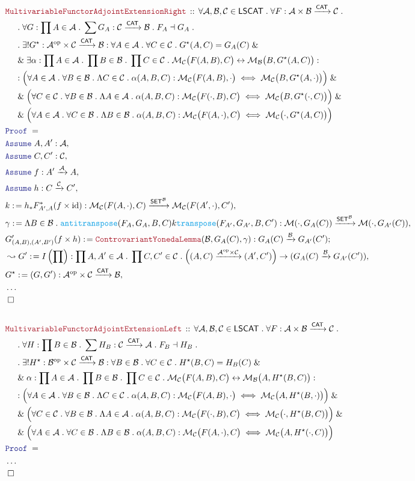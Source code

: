 \documentclass[12pt]{scrartcl}
\newcommand{\FUNC}[1]{\textcolor{Cerulean}{\mathtt{#1}}}
\newcommand{\LOGIC}[1]{\textcolor{Blue}{\mathtt{#1}}}
\newcommand{\THM}[1]{\textcolor{Maroon}{\mathtt{#1}}}
\renewcommand{\.}{\; . \;}
\newcommand{\de}{: \kern 0.1pc =}
\newcommand{\Theorem}[2]{& \THM{#1} \, :: \, #2 \\ & \Proof = \\ }
\newcommand{\NewLine}{\\ & \kern 1pc}
\newcommand{\Page}[1]{ \begin{align*} #1 \end{align*}   }
\newcommand{\NoProof}{ & \ldots \\ \EndProof}
\renewcommand{\And}{\; \& \;}
\DeclareMathOperator*{\id}{id}
\newcommand{\Mor}{\mathcal{M}}
\newcommand{\ToBij}{\leftrightarrow}
\newcommand{\Arrow}{\xrightarrow}
\newcommand{\Say}[3]{& #1 \de #2 : #3, \\}
\newcommand{\Conclude}[3]{& #1 \de #2 : #3; \\}
\newcommand{\Derive}[3]{& \leadsto #1 \de #2 : #3, \\}
\newcommand{\Assume}[2]{& \LOGIC{Assume} \; #1 : #2, \\}
\newcommand{\QED}{\; \square}
\newcommand{\EndProof}{& \QED \\}
\newcommand{\Proof}{\LOGIC{Proof} \; }
\newcommand{\op}{\mathrm{op}}
\newcommand{\C}{\mathcal{C}}
\newcommand{\A}{\mathcal{A}}
\newcommand{\B}{\mathcal{B}}
\newcommand{\CAT}{\mathsf{CAT}}
\newcommand{\SET}{\mathsf{SET}}
\begin{document}
\newpage
\Page{
	\Theorem{MultivariableFunctorAdjointExtensionRight}{
		\forall \A, \B, \C \in \mathsf{LSCAT} \.
		\forall F : \A \times \B \Arrow{\CAT} \C \. \NewLine \.
		\forall G  : \prod A \in \A \. 
			\sum G_A :  \C \Arrow{\CAT} \B \.  
			F_A \dashv G_A \. \NewLine \.
		\exists!  G^\star : \A^\op \times \C \Arrow{\CAT} \B :
		\forall A \in \A \. \forall C \in \C \. G^\star(A,C) = G_A(C) \And \NewLine \And
		\exists \alpha : \prod A \in \A \. 
			\prod B \in \B \. 
			\prod C \in \C \.  
			\Mor_\C\big(F(A,B),C\big) \ToBij \Mor_\B\big(B,G^\star(A,C)\big) : \NewLine :
			\Big(	\forall A \in \A \. 
				\forall B \in \B \.
				\Lambda C \in \C  \. 
				\alpha(A,B,C) :  \Mor_{\C}\big( F(A,B),\cdot\big) \iff  \Mor_{\C}\big(B,G^\star(A,\cdot)\big)
			\Big) \And \NewLine \And
			\Big(	\forall C \in \C \.
				\forall B \in \B \.
				\Lambda A \in \A  \. 
				\alpha(A,B,C) :  \Mor_{\C}\big( F(\cdot,B),C\big) \iff  \Mor_{\C}\big(B,G^\star(\cdot,C)\big)
			\Big) \And \NewLine \And
			\Big(	\forall A \in \A \.
				\forall C \in \B \.
				\Lambda B \in \B  \. 
				\alpha(A,B,C) :  \Mor_{\C}\big( F(A,\cdot),C\big) \iff  \Mor_{\C}\big(\cdot,G^\star(A,C)\big)
			\Big) 
		}
		\Assume{A,A'}{\A}
		\Assume{C,C'}{\C}
		\Assume{f}{A' \Arrow{\A} A}
		\Assume{h}{C \Arrow{\C} C'}
		\Say{k}{h_*F_{A',A}^*(f \times \id)}{  \Mor_\C(F(A,\cdot),C) \Arrow{\SET^\B} \Mor_\C(F(A',\cdot),C') }
		\Say{\gamma}{ \Lambda B \in \B \.  \FUNC{antitranspose}(F_A,G_A,B,C) k \FUNC{transpose}(F_{A'},G_{A'},B,C')}
		{   \Mor(\cdot,G_A(C)) \Arrow{\SET^\B}  \Mor(\cdot,G_{A'}(C)) }
		\Conclude{G'_{(A,B),(A',B')}(f \times h)}{\THM{ControvariantYonedaLemma}(\B,G_A(C),\gamma)}
		{  G_A(C) \Arrow{\B} G_{A'}(C')  }
		\Derive{G'}{I\left( \prod \right)}{ \prod A,A' \in \A \. \prod C,C' \in \C \. 
			\Big( (A, C) \Arrow{\A^\op \times \C } (A',C') \Big) \to (G_A(C) \Arrow{\B} G_{A'}(C'))  }
		\Say{G^\star}{(G,G')}{ \A^\op \times \C \Arrow{\CAT} \B  }
		\NoProof
		\\
	\Theorem{MultivariableFunctorAdjointExtensionLeft}{
		\forall \A, \B, \C \in \mathsf{LSCAT} \.
		\forall F : \A \times \B \Arrow{\CAT} \C \. \NewLine \.
		\forall H  : \prod B \in \B \. 
			\sum H_B :  \C \Arrow{\CAT} \A \.  
			 F_B \dashv H_B \. \NewLine \.
		\exists!  H^\star : \B^\op \times \C \Arrow{\CAT} \B :
		\forall B \in \B \. \forall C \in \C \. H^\star(B,C) = H_B(C) \And \NewLine \And
			\alpha : \prod A \in \A \. 
			\prod B \in \B \. 
			\prod C \in \C \.  
			\Mor_\C\big(F(A,B),C\big) \ToBij \Mor_\B\big(A,H^\star(B,C)\big) : \NewLine :
			\Big(	\forall A \in \A \. 
				\forall B \in \B \.
				\Lambda C \in \C  \. 
				\alpha(A,B,C) :  \Mor_{\C}\big( F(A,B),\cdot\big) \iff  \Mor_{\C}\big(A,H^\star(B,\cdot)\big)
			\Big) \And \NewLine \And
			\Big(	\forall C \in \C \.
				\forall B \in \B \.
				\Lambda A \in \A  \. 
				\alpha(A,B,C) :  \Mor_{\C}\big( F(\cdot,B),C\big) \iff  \Mor_{\C}\big(\cdot,H^\star(B,C)\big)
			\Big) \And \NewLine \And
			\Big(	\forall A \in \A \.
				\forall C \in \B \.
				\Lambda B \in \B  \. 
				\alpha(A,B,C) :  \Mor_{\C}\big( F(A,\cdot),C\big) \iff  \Mor_{\C}\big(A,H^\star(\cdot,C)\big)
			\Big) 
		}
		\NoProof
} \newpage
\end{document}
